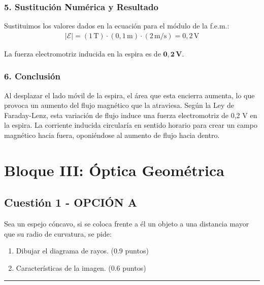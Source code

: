 \subsubsection*{5. Sustitución Numérica y Resultado}
Sustituimos los valores dados en la ecuación para el módulo de la f.e.m.:
\begin{gather}
    |\mathcal{E}| = (1 \, \text{T}) \cdot (0,1 \, \text{m}) \cdot (2 \, \text{m/s}) = 0,2 \, \text{V}
\end{gather}
\begin{cajaresultado}
    La fuerza electromotriz inducida en la espira es de $\boldsymbol{0,2 \, \textbf{V}}$.
\end{cajaresultado}

\subsubsection*{6. Conclusión}
\begin{cajaconclusion}
Al desplazar el lado móvil de la espira, el área que esta encierra aumenta, lo que provoca un aumento del flujo magnético que la atraviesa. Según la Ley de Faraday-Lenz, esta variación de flujo induce una fuerza electromotriz de 0,2 V en la espira. La corriente inducida circularía en sentido horario para crear un campo magnético hacia fuera, oponiéndose al aumento de flujo hacia dentro.
\end{cajaconclusion}

\newpage
\section{Bloque III: Óptica Geométrica}
\label{sec:optica_2001_sep_ext}

\subsection{Cuestión 1 - OPCIÓN A}
\label{subsec:3A_2001_sep_ext}

\begin{cajaenunciado}
Sea un espejo cóncavo, si se coloca frente a él un objeto a una distancia mayor que su radio de curvatura, se pide:
\begin{enumerate}
    \item Dibujar el diagrama de rayos. (0.9 puntos)
    \item Características de la imagen. (0.6 puntos)
\end{enumerate}
\end{cajaenunciado}
\hrule

